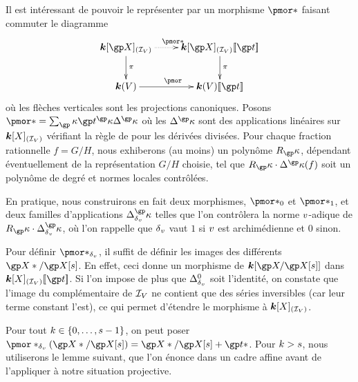 Il est intéressant de pouvoir le représenter par un morphisme \( \pmor* \)
faisant commuter le diagramme
\begin{equation} \label{e:pmor}
  \begin{aligned}[c]
    \xymatrix{
      \cdn[\vp]_{(\ideal\anyvar)}               \ar[d]^\pi \ar@{.>}[r]^{\pmor*}
      & \cdn[\vp]_{(\ideal\anyvar)} \series\psp \ar[d]^\pi
      \\ \cdn(\anyvar)                                     \ar[r]^{\pmor}
      & \cdn(\anyvar)\series\psp
    }
  \end{aligned}
\end{equation}
où les flèches verticales sont les projections canoniques. Posons
\( \pmor* = \sum_\derp \psp^\derp \pdiff*^\derp \) où les \( \pdiff*^\derp \)
sont des applications linéaires sur \( {\boldsymbol k}[X]_{(\mathcal I\sb{V})} \) vérifiant
la règle de  pour les dérivées divisées. Pour chaque fraction
rationnelle \( f = G/H \), nous exhiberons (au moins) un polynôme \( R_\derp
\), dépendant éventuellement de la représentation \( G/H \) choisie, tel que
\( R_\derp \cdot \pdiff*^\derp(f) \) soit un polynôme de degré et normes
locales contrôlées.

En pratique, nous construirons en fait deux morphismes, \( \pmor*_0 \) et \(
  \pmor*_1 \), et deux familles d'applications \( \pdiff^\derp \) telles que
l'on contrôlera la norme \( v \)-adique de \( R_\derp \cdot \pdiff^\derp
\), où l'on rappelle que \( {\delta\smash{\sb v}} \) vaut \( 1 \) si \( v \) est
archimédienne et \( 0 \) sinon.

Pour définir \( \pmor*_\dv \), il suffit de définir les images des différents
\( \vp* / \vp[\anydim] \). En effet, ceci donne un morphisme de \( \cdn[ \vp /
  \vp[\anydim] ] \) dans \( \cdn[X]_{(\ideal\anyvar)} \series\psp \). Si l'on
impose de plus que \( \pdiff^0 \) soit l'identité, on constate que l'image du
complémentaire de \( \mathcal I\sb{V} \) ne contient que des séries inversibles
(car leur terme constant l'est), ce qui permet d'étendre le morphisme à \(
  {\boldsymbol k}[X]_{(\mathcal I\sb{V})} \).

Pour tout \( k \in \lbrace0, \dots, s-1\rbrace \), on peut poser \(
  \pmor*_\dv(\vp*/\vp[\anydim]) = \vp*/\vp[\anydim] + \psp* \). Pour \( k >
  s \), nous utiliserons le lemme suivant, que l'on énonce dans un cadre
affine avant de l'appliquer à notre situation projective.

